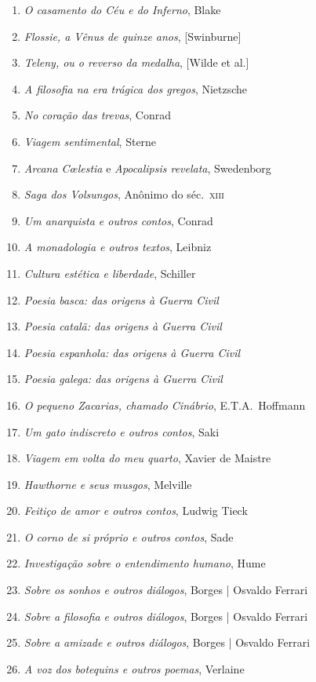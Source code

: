 \begin{enumerate}
\item \textit{O casamento do Céu e do Inferno}, Blake
\item \textit{Flossie, a Vênus de quinze anos}, [Swinburne]
\item \textit{Teleny, ou o reverso da medalha}, [Wilde et al.]
\item \textit{A filosofia na era trágica dos gregos}, Nietzsche
\item \textit{No coração das trevas}, Conrad
\item \textit{Viagem sentimental}, Sterne
\item \textit{Arcana C\oe lestia} e \textit{Apocalipsis revelata}, Swedenborg
\item \textit{Saga dos Volsungos}, Anônimo do séc.~\textsc{xiii}
\item \textit{Um anarquista e outros contos}, Conrad
\item \textit{A monadologia e outros textos}, Leibniz
\item \textit{Cultura estética e liberdade}, Schiller
\item \textit{Poesia basca: das origens à Guerra Civil} 
\item \textit{Poesia catalã: das origens à Guerra Civil} 
\item \textit{Poesia espanhola: das origens à Guerra Civil} 
\item \textit{Poesia galega: das origens à Guerra Civil} 
\item \textit{O pequeno Zacarias, chamado Cinábrio}, E.T.A.~Hoffmann
\item \textit{Um gato indiscreto e outros contos}, Saki
\item \textit{Viagem em volta do meu quarto}, Xavier de Maistre 
\item \textit{Hawthorne e seus musgos}, Melville
\item \textit{Feitiço de amor e outros contos}, Ludwig Tieck
\item \textit{O corno de si próprio e outros contos}, Sade
\item \textit{Investigação sobre o entendimento humano}, Hume
\item \textit{Sobre os sonhos e outros diálogos}, Borges | Osvaldo Ferrari
\item \textit{Sobre a filosofia e outros diálogos}, Borges | Osvaldo Ferrari
\item \textit{Sobre a amizade e outros diálogos}, Borges | Osvaldo Ferrari
\item \textit{A voz dos botequins e outros poemas}, Verlaine 

\end{enumerate}
